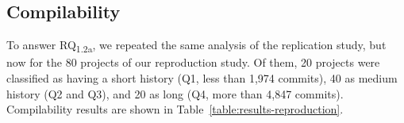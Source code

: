 
\subsection{Compilability}

To answer RQ\textsubscript{1.2a}, we repeated the same analysis of the replication study, but now for the 80 projects of our reproduction study. Of them, 20 projects were classified as having a short history (Q1, less than 1,974 commits), 40 as medium history (Q2 and Q3), and 20 as long (Q4, more than 4,847 commits). Compilability results are shown in Table~\ref{table:results-reproduction}.

\begin{table*}[h]
\caption{Reproduction study - Compilability results}
\label{table:results-reproduction}


\begin{center}
\end{center}


\end{table*}
